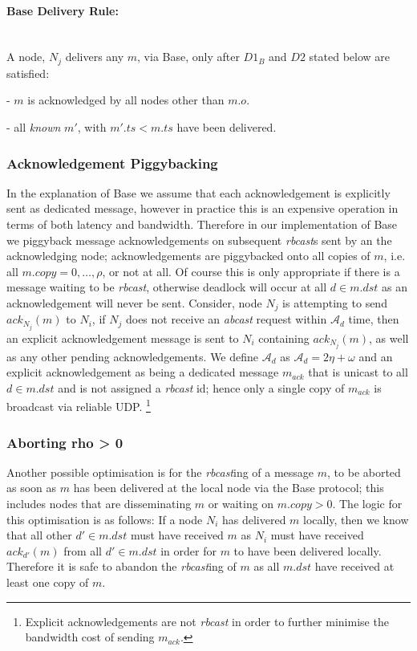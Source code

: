     \paragraph{\textsf{Base} Delivery Rule:}\hspace{0pt} \\
	    A node, $N_j$ delivers any $m$, via \textsf{Base}, only after $D1_B$ and $D2$ stated below are satisfied:
	    \begin{description}[labelindent=1cm]
	        \item[$\boldsymbol{D1_B}$] - $m$ is acknowledged by all nodes other than $m.o$. 
	        \item[$\boldsymbol{D2}$] - all \emph{known} $m'$, with $m'.ts < m.ts$ have been delivered.
	    \end{description}
    
    \subsubsection*{Acknowledgement Piggybacking}
    In the explanation of \textsf{Base} we assume that each acknowledgement is explicitly sent as dedicated message, however in practice this is an expensive operation in terms of both latency and bandwidth.  Therefore in our implementation of \textsf{Base} we piggyback message acknowledgements on subsequent \emph{rbcast}s sent by an the acknowledging node; acknowledgements are piggybacked onto all copies of $m$, i.e. all $m.copy =0,\ldots,\rho$, or not at all.  Of course this is only appropriate if there is a message waiting to be \emph{rbcast}, otherwise deadlock will occur at all $d \in m.dst$ as an acknowledgement will never be sent.  Consider, node $N_j$ is attempting to send $ack_{N_j}(m)$ to $N_i$, if $N_j$ does not receive an \emph{abcast} request within $\mathcal{A}_d$ time, then an explicit acknowledgement message is sent to $N_i$ containing $ack_{N_j}(m)$, as well as any other pending acknowledgements.  We define $\mathcal{A}_d$ as $\mathcal{A}_d = 2\eta + \omega$ and an explicit acknowledgement as being a dedicated message $m_{ack}$ that is unicast to all $d \in m.dst$ and is not assigned a \emph{rbcast} id; hence only a single copy of $m_{ack}$ is broadcast via reliable UDP.  \footnote{Explicit acknowledgements are not \emph{rbcast} in order to further minimise the bandwidth cost of sending $m_{ack}$.}
    
    \subsubsection*{Aborting rho > 0}
    Another possible optimisation is for the \emph{rbcast}ing of a message $m$, to be aborted as soon as $m$ has been delivered at the local node via the \textsf{Base} protocol; this includes nodes that are disseminating $m$ or waiting on $m.copy > 0$.  The logic for this optimisation is as follows: If a node $N_i$ has delivered $m$ locally, then we know that all other $d' \in m.dst$ must have received $m$ as $N_i$ must have received $ack_{d'}(m)$ from all $d' \in m.dst$ in order for $m$ to have been delivered locally.  Therefore it is safe to abandon the \emph{rbcast}ing of $m$ as all $m.dst$ have received at least one copy of $m$. 
    

